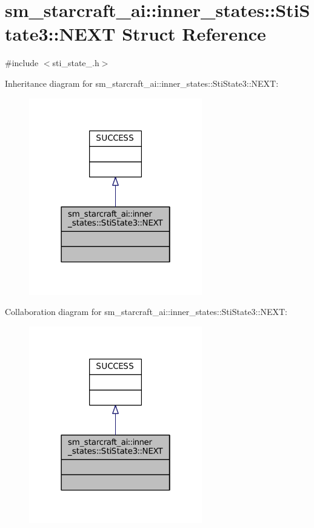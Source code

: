 \hypertarget{structsm__starcraft__ai_1_1inner__states_1_1StiState3_1_1NEXT}{}\section{sm\+\_\+starcraft\+\_\+ai\+:\+:inner\+\_\+states\+:\+:Sti\+State3\+:\+:N\+E\+XT Struct Reference}
\label{structsm__starcraft__ai_1_1inner__states_1_1StiState3_1_1NEXT}


{\ttfamily \#include $<$sti\+\_\+state\+\_.\+h$>$}



Inheritance diagram for sm\+\_\+starcraft\+\_\+ai\+:\+:inner\+\_\+states\+:\+:Sti\+State3\+:\+:N\+E\+XT\+:
\nopagebreak
\begin{figure}[H]
\begin{center}
\leavevmode
\includegraphics[width=214pt]{structsm__starcraft__ai_1_1inner__states_1_1StiState3_1_1NEXT__inherit__graph}
\end{center}
\end{figure}


Collaboration diagram for sm\+\_\+starcraft\+\_\+ai\+:\+:inner\+\_\+states\+:\+:Sti\+State3\+:\+:N\+E\+XT\+:
\nopagebreak
\begin{figure}[H]
\begin{center}
\leavevmode
\includegraphics[width=214pt]{structsm__starcraft__ai_1_1inner__states_1_1StiState3_1_1NEXT__coll__graph}
\end{center}
\end{figure}


